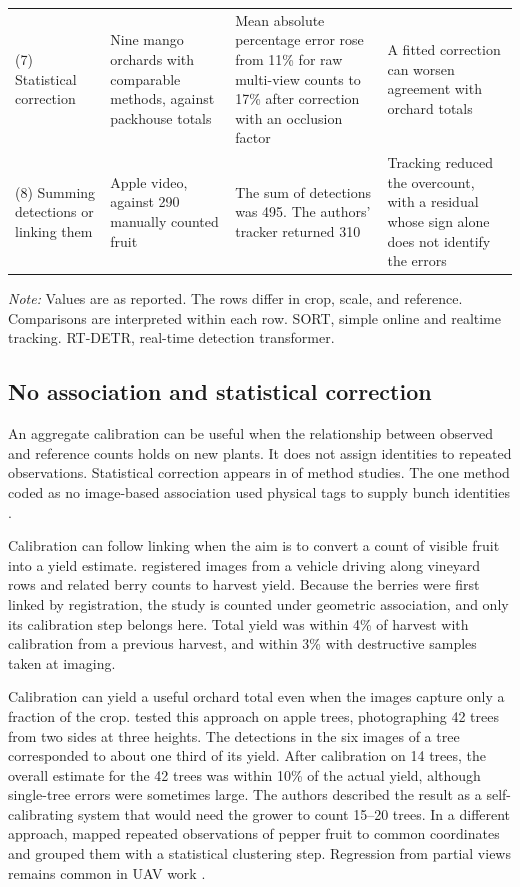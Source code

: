 \begin{table}[!t]
\begin{tabularx}{\textwidth}{@{}L{2.6cm}L{3.4cm}YL{3.5cm}@{}}
\addlinespace
(7) Statistical correction \citep{anderson2021estimation} & Nine mango orchards with comparable methods, against packhouse totals & Mean absolute percentage error rose from 11\% for raw multi-view counts to 17\% after correction with an occlusion factor & A fitted correction can worsen agreement with orchard totals\\
\addlinespace
(8) Summing detections or linking them \citep{hu2023fruit} & Apple video, against 290 manually counted fruit & The sum of detections was 495. The authors' tracker returned 310 & Tracking reduced the overcount, with a residual whose sign alone does not identify the errors\\
\bottomrule
\end{tabularx}

\smallskip
\parbox{\textwidth}{\rmfamily\footnotesize\textit{Note:} Values are as reported. The rows differ in crop, scale, and reference. Comparisons are interpreted within each row. SORT, simple online and realtime tracking. RT-DETR, real-time detection transformer.}
\end{table}

\subsection{No association and statistical correction}\label{sec:mech-stat}
An aggregate calibration can be useful when the relationship between observed and reference counts holds on new plants. It does not assign identities to repeated observations. Statistical correction appears in \nStat of \nMethod method studies. The one method coded as no image-based association used physical tags to supply bunch identities \citep{kassim2012oil}.

Calibration can follow linking when the aim is to convert a count of visible fruit into a yield estimate. \citet{nuske2014modeling} registered images from a vehicle driving along vineyard rows and related berry counts to harvest yield. Because the berries were first linked by registration, the study is counted under geometric association, and only its calibration step belongs here. Total yield was within 4\% of harvest with calibration from a previous harvest, and within 3\% with destructive samples taken at imaging.

Calibration can yield a useful orchard total even when the images capture only a fraction of the crop. \citet{linker2015estimation} tested this approach on apple trees, photographing 42 trees from two sides at three heights. The detections in the six images of a tree corresponded to about one third of its yield. After calibration on 14 trees, the overall estimate for the 42 trees was within 10\% of the actual yield, although single-tree errors were sometimes large. The authors described the result as a self-calibrating system that would need the grower to count 15--20 trees. In a different approach, \citet{song2014automatic} mapped repeated observations of pepper fruit to common coordinates and grouped them with a statistical clustering step. Regression from partial views remains common in UAV work \citep{apoloapolo2020cloud,li2023blueberry}.

